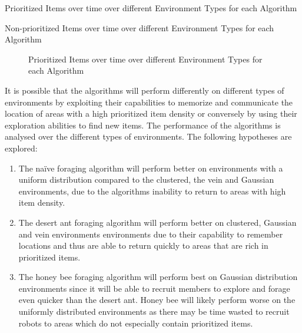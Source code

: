 \begin{table} [h]
     \caption{Prioritized Items over time over different Environment Types for each Algorithm}
     \label{environmenttypeprioritized}
	\centering
	\footnotesize
	
\end{table}

\begin{table} [h]
     \caption{Non-prioritized Items over time over different Environment Types for each Algorithm}
     \label{environmenttypenonprioritized}
	\centering
	\footnotesize
	
\end{table}

\begin{figure}[!htb]
\centering
\resizebox{0.8\textwidth}{!}{}
\caption{Prioritized Items over time over different Environment Types for each Algorithm}
\label{environmenttypes}
\end{figure}


It is possible that the algorithms will perform differently on different types of environments by exploiting their capabilities to memorize and communicate the location of areas with a high prioritized item density or conversely by using their exploration abilities to find new items. The performance of the algorithms is analysed over the different types of environments. The following hypotheses are explored:  

\begin{enumerate}
	\item The na\"ive foraging algorithm will perform better on environments with a uniform distribution compared to the clustered, the vein and Gaussian environments, due to the algorithms inability to return to areas with high item density. 
	\item The desert ant foraging algorithm will perform better on clustered, Gaussian and vein environments environments due to their capability to remember locations and thus are able to return quickly to areas that are rich in prioritized items.
	 \item The honey bee foraging algorithm will perform best on Gaussian distribution environments since it will be able to recruit members to explore and forage even quicker than the desert ant. Honey bee will likely perform worse on the uniformly distributed environments as there may be time wasted to recruit robots to areas which do not especially contain prioritized items.
\end{enumerate}

